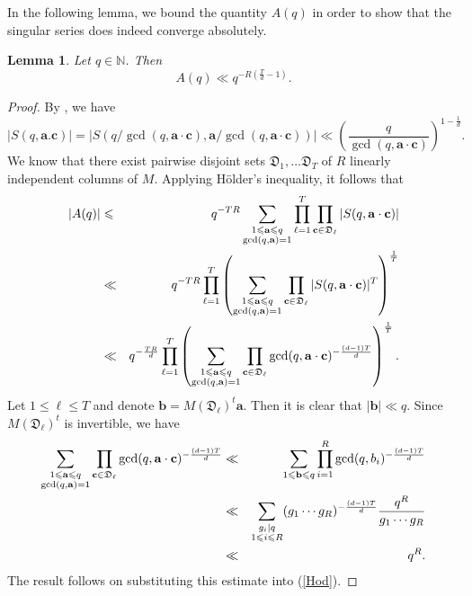 \documentclass[reqno, 12pt, reqno]{amsart}
\numberwithin{equation}{section}
\newtheorem{lemma}[theorem]{Lemma}
\renewcommand{\leq}{\leqslant}
\renewcommand{\c}{\mathbf{c}}
\renewcommand{\b}{\mathbf{b}}
\renewcommand{\a}{\mathbf{a}}
\renewcommand{\=}{\equiv}
\begin{document}
In the following lemma, we bound the quantity $A(q)$ in order to show that the singular series does indeed converge absolutely.
\begin{lemma}
\label{lemA}
Let $q \in \mathbb{N}$.
Then
$$
A (q)  \ll  q^{- R( \frac{ T }{d} - 1  )}.
$$
\end{lemma}
\begin{proof}
By \cite[Lemma 6.4]{Davenport}, we have
$$
|S(q, \a.\c)| =  |S(q /\gcd(q, \a\cdot\c) ,  \a/ \gcd(q, \a\cdot\c) ) | \ll  \left( \frac{q}{\gcd(q, \a\cdot\c)}  \right)^{1 - \frac{1}{d} }.
$$
We know that there exist pairwise disjoint sets $\mathfrak D_1, \ldots \mathfrak D_T$ of $R$ linearly independent columns of $M$.
Applying H{\"o}lder's inequality, it follows that
\begin{eqnarray}
\label{Hod}
 |A(q)|  &\leq&  q^{  - T R } \sum_{ \substack{ 1 \leq  \a \leq  q \\ \gcd(q, \a) = 1  } }  \prod_{\ell = 1}^{T}  \prod_{\c \in \mathfrak{D}_\ell } |S(q, \a\cdot\c)|
\\
&\ll&
\notag
q^{  - T R }   \prod_{\ell = 1}^{ T }   \left( \sum_{ \substack{ 1 \leq  \a \leq  q \\ \gcd(q, \a) = 1  } }  \prod_{\c \in \mathfrak{D}_\ell }   |S(q, \a\cdot\c)|^T    \right)^{\frac{ 1 }{ T }}
\\
&\ll&
\notag
q^{ - \frac{T R }{d} }  \prod_{\ell = 1}^{ T }   \left( \sum_{ \substack{ 1 \leq  \a \leq  q \\ \gcd(q, \a) = 1  } }  \prod_{\c \in \mathfrak{D}_\ell }  \gcd(q, \a\cdot\c)^{- \frac{  (d-1)  T  }{d} }    \right)^{\frac{ 1 }{ T }}.
\end{eqnarray}
Let $1 \leq \ell \leq T$ and denote $\b =  M( \mathfrak{D}_\ell )^t \a$.
Then it is clear that $|\b| \ll q$. Since $M( \mathfrak{D}_\ell )^t$ is invertible, we have
\begin{eqnarray}
\sum_{ \substack{ 1 \leq  \a \leq  q \\ \gcd(q, \a) = 1  } }  \prod_{\c \in \mathfrak{D}_\ell }  \gcd(q, \a\cdot\c)^{- \frac{ (d-1) T }{d} }
&\ll&
\sum_{1 \leq \b \leq q}   \prod_{i = 1}^{R} \gcd(q, b_i)^{- \frac{ (d-1) T }{d}}
\notag
\\
\notag
&\ll&
\sum_{ \substack{  g_i | q  \\ 1 \leq i \leq R } }   (g_1 \cdots g_R)^{- \frac{(d-1) T}{d}}  \frac{ q^R }{g_1 \cdots g_{R}}
\\
\notag
&\ll& q^{R}.
\end{eqnarray}
The result follows on substituting this estimate into (\ref{Hod}).
\end{proof}
\end{document}
